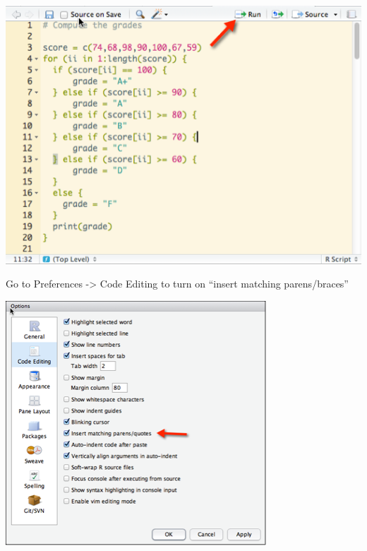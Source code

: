\documentclass{beamer}
\begin{document}
\begin{frame}[fragile]
\begin{center}
\includegraphics{../IMG/rstudioedit.png}
\end{center}
\end{frame}

%

\begin{frame}[fragile]
Go to Preferences -> Code Editing to turn on ``insert matching parens/braces'' 
\begin{center}
\includegraphics{../IMG/braces.png}
\end{center}
\end{frame}

%
\end{document}
